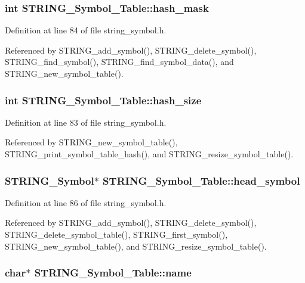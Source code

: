\subsubsection{\setlength{\rightskip}{0pt plus 5cm}int \bf{STRING\_\-Symbol\_\-Table::hash\_\-mask}}\label{structSTRING__Symbol__Table_2a70b07a2fa7974eba88b255b97d7818}




Definition at line 84 of file string\_\-symbol.h.

Referenced by STRING\_\-add\_\-symbol(), STRING\_\-delete\_\-symbol(), STRING\_\-find\_\-symbol(), STRING\_\-find\_\-symbol\_\-data(), and STRING\_\-new\_\-symbol\_\-table().
\subsubsection{\setlength{\rightskip}{0pt plus 5cm}int \bf{STRING\_\-Symbol\_\-Table::hash\_\-size}}\label{structSTRING__Symbol__Table_87f0005dbe4a9d25352a84c76414d496}




Definition at line 83 of file string\_\-symbol.h.

Referenced by STRING\_\-new\_\-symbol\_\-table(), STRING\_\-print\_\-symbol\_\-table\_\-hash(), and STRING\_\-resize\_\-symbol\_\-table().
\subsubsection{\setlength{\rightskip}{0pt plus 5cm}\bf{STRING\_\-Symbol}$\ast$ \bf{STRING\_\-Symbol\_\-Table::head\_\-symbol}}\label{structSTRING__Symbol__Table_c7a0ee13203010e88bafefe25538a7bc}




Definition at line 86 of file string\_\-symbol.h.

Referenced by STRING\_\-add\_\-symbol(), STRING\_\-delete\_\-symbol(), STRING\_\-delete\_\-symbol\_\-table(), STRING\_\-first\_\-symbol(), STRING\_\-new\_\-symbol\_\-table(), and STRING\_\-resize\_\-symbol\_\-table().
\subsubsection{\setlength{\rightskip}{0pt plus 5cm}char$\ast$ \bf{STRING\_\-Symbol\_\-Table::name}}\label{structSTRING__Symbol__Table_9f60b123e6a1ab4ee29c8cdb2409352d}




